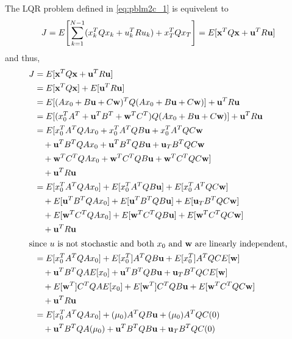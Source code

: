 \documentclass[]{article}
\begin{document}
The LQR problem defined in \eqref{eq:pblm2c_1} is equivelent to \[
    J = E \qty[\sum_{k=1}^{N-1} (x_k^T Q x_k + u_k^T R u_k) + x_T^T Q x_T] = E[\vb{x}^T Q \vb{x} + \vb{u}^T R \vb{u}]
\]
and thus,
\begin{align*}
    J &= E[\vb{x}^T Q \vb{x} + \vb{u}^T R \vb{u}]\\
        &= E[\vb{x}^T Q \vb{x}] + E[\vb{u}^T R \vb{u}]\\
        &= E[(A x_0 + B \vb{u} + C \vb{w})^T Q (A x_0 + B \vb{u} + C \vb{w})] + \vb{u}^T R \vb{u}\\
        &= E[(x_0^T A^T + \vb{u}^T B^T + \vb{w}^T C^T) Q (A x_0 + B \vb{u} + C \vb{w})] + \vb{u}^T R \vb{u}\\
        &= E[
            x_0^T A^T Q A x_0 + x_0^T A^T Q B \vb{u} + x_0^T A^T Q C \vb{w}
            \\&\quad
            + \vb{u}^T B^T Q A x_0 + \vb{u}^T B^T Q B \vb{u} + \vb{u}_T B^T Q C \vb{w}
            \\&\quad
            + \vb{w}^T C^T Q A x_0 + \vb{w}^T C^T Q B \vb{u} + \vb{w}^T C^T Q C \vb{w}] 
            \\&\quad
        + \vb{u}^T R \vb{u}\\
        &= E[x_0^T A^T Q A x_0] + E[x_0^T A^T Q B \vb{u}] + E[x_0^T A^T Q C \vb{w}]
            \\&\quad
            + E[\vb{u}^T B^T Q A x_0] + E[\vb{u}^T B^T Q B \vb{u}] + E[\vb{u}_T B^T Q C \vb{w}]
            \\&\quad
            + E[\vb{w}^T C^T Q A x_0] + E[\vb{w}^T C^T Q B \vb{u}] + E[\vb{w}^T C^T Q C \vb{w}]
            \\&\quad
            + \vb{u}^T R \vb{u}\\
\intertext{since $u$ is not stochastic and both $x_0$ and $\vb{w}$ are linearly independent,}
        &= E[x_0^T A^T Q A x_0] + E[x_0^T] A^T Q B \vb{u} + E[x_0^T] A^T Q C E[\vb{w}]
        \\&\quad
            + \vb{u}^T B^T Q A E[x_0] + \vb{u}^T B^T Q B \vb{u} + \vb{u}_T B^T Q C E[\vb{w}]
            \\&\quad
            + E[\vb{w}^T] C^T Q A E[x_0] + E[\vb{w}^T] C^T Q B \vb{u} + E[\vb{w}^T C^T Q C \vb{w}]
            \\&\quad
            + \vb{u}^T R \vb{u}\\
        &= E[x_0^T A^T Q A x_0] + (\mu_0) A^T Q B \vb{u} + (\mu_0) A^T Q C (0)
        \\&\quad
            + \vb{u}^T B^T Q A (\mu_0) + \vb{u}^T B^T Q B \vb{u} + \vb{u}_T B^T Q C (0)

\end{align*}
\end{document}
